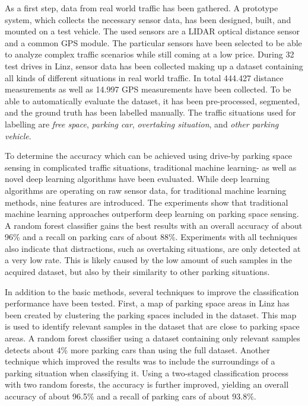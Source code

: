 As a first step, data from real world traffic has been gathered. A prototype system, which collects the necessary sensor data, has been designed, built, and mounted on a test vehicle. The used sensors are a LIDAR optical distance sensor and a common GPS module. The particular sensors have been selected to be able to analyze complex traffic scenarios while still coming at a low price. 
During 32 test drives in Linz, sensor data has been collected making up a dataset containing all kinds of different situations in real world traffic. 
In total 444.427 distance measurements as well as 14.997 GPS measurements have been collected.
To be able to automatically evaluate the dataset, it has been pre-processed, segmented, and the ground truth has been labelled manually. The traffic situations used for labelling are \emph{free space}, \emph{parking car}, \emph{overtaking situation}, and \emph{other parking vehicle}.

To determine the accuracy which can be achieved using drive-by parking space sensing in complicated traffic situations, traditional machine learning- as well as novel deep learning algorithms have been evaluated. While deep learning algorithms are operating on raw sensor data, for traditional machine learning methods, nine features are introduced. The experiments show that traditional machine learning approaches outperform deep learning on parking space sensing. A random forest classifier gains the best results with an overall accuracy of about 96\% and a recall on parking cars of about 88\%. Experiments with all techniques also indicate that distractions, such as overtaking situations, are only detected at a very low rate. This is likely caused by the low amount of such samples in the acquired dataset, but also by their similarity to other parking situations.

In addition to the basic methods, several techniques to improve the classification performance have been tested. First, a map of parking space areas in Linz has been created by clustering the parking spaces included in the dataset. This map is used to identify relevant samples in the dataset that are close to parking space areas. A random forest classifier using a dataset containing only relevant samples detects about 4\% more parking cars than using the full dataset. Another technique which improved the results was to include the surroundings of a parking situation when classifying it. Using a two-staged classification process with two random forests, the accuracy is further improved, yielding an overall accuracy of about 96.5\% and a recall of parking cars of about 93.8\%.

